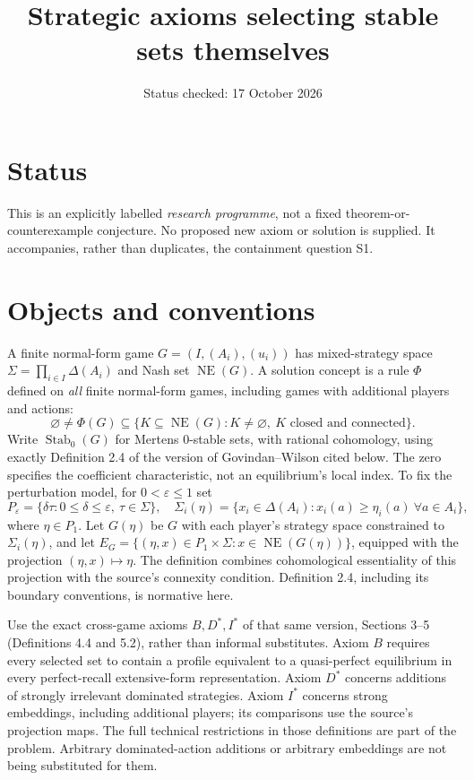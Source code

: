 \documentclass[11pt]{article}
\title{Strategic axioms selecting stable sets themselves}
\author{}
\date{Status checked: 17 October 2026}
\newcommand{\NE}{\operatorname{NE}}
\newcommand{\Stab}{\operatorname{Stab}_0}
\begin{document}
\maketitle
\section*{Status}
This is an explicitly labelled \emph{research programme}, not a fixed
theorem-or-counterexample conjecture. No proposed new axiom or solution
is supplied. It accompanies, rather than duplicates, the containment
question S1.
\section*{Objects and conventions}
A finite normal-form game $G=(I,(A_i),(u_i))$ has mixed-strategy space
$\Sigma=\prod_{i\in I}\Delta(A_i)$ and Nash set $\NE(G)$.
A solution concept is a rule $\Phi$ defined on \emph{all} finite
normal-form games, including games with additional players and actions:
\[
 \varnothing\ne\Phi(G)\subseteq
 \{K\subseteq\NE(G):K\ne\varnothing,\ K\text{ closed and connected}\}.
\]
Write $\Stab(G)$ for Mertens $0$-stable sets, with rational cohomology,
using exactly Definition 2.4 of the version of Govindan--Wilson cited
below. The zero specifies the coefficient characteristic, not an
equilibrium's local index. To fix the perturbation model, for
$0<\varepsilon\leq1$ set
\[
 P_\varepsilon=\{\delta\tau:0\leq\delta\leq\varepsilon,\ \tau\in\Sigma\},
 \quad \Sigma_i(\eta)=\{x_i\in\Delta(A_i):x_i(a)\geq\eta_i(a)\ \forall a\in A_i\},
\]
where $\eta\in P_1$. Let $G(\eta)$ be $G$ with each player's
strategy space constrained to $\Sigma_i(\eta)$, and let
$E_G=\{(\eta,x)\in P_1\times\Sigma:x\in\NE(G(\eta))\}$,
equipped with the projection $(\eta,x)\mapsto\eta$.
The definition combines cohomological essentiality
of this projection with the source's connexity condition. Definition 2.4,
including its boundary conventions, is normative here.

Use the exact cross-game axioms $B,D^*,I^*$ of that same version,
Sections 3--5 (Definitions 4.4 and 5.2), rather than informal substitutes.
Axiom $B$ requires every selected set to contain a profile equivalent to
a quasi-perfect equilibrium in every perfect-recall extensive-form
representation. Axiom $D^*$ concerns additions of strongly irrelevant
dominated strategies. Axiom $I^*$ concerns strong embeddings, including
additional players; its comparisons use the source's projection maps.
The full technical restrictions in those definitions are part of the
problem. Arbitrary dominated-action additions or arbitrary embeddings
are not being substituted for them.
\end{document}
